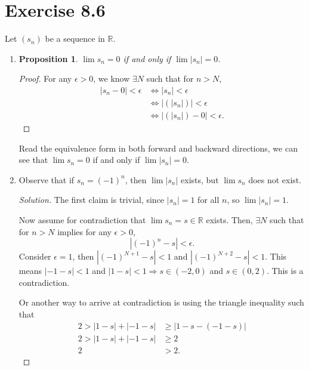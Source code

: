 \documentclass{article}
\newtheorem{proposition}[thm]{Proposition}
\begin{document}
\section*{Exercise 8.6}
Let $(s_n)$ be a sequence in $\mathbb{R}$.
\begin{enumerate}[label=(\alph*)]
    \item 
    \begin{proposition}
        $\lim s_n=0$ if and only if $\lim |s_n|=0$.
    \end{proposition}
    \begin{proof}
        For any $\epsilon>0$, we know $\exists N$ such that for $n>N$, 
        \begin{align*}
            |s_n-0| <\epsilon &\Leftrightarrow |s_n| < \epsilon \\
            &\Leftrightarrow |(|s_n|)| < \epsilon \\
            & \Leftrightarrow |(|s_n|)-0| < \epsilon.
        \end{align*}
    \end{proof}

    Read the equivalence form in both forward and backward directions, we can see that 
    $\lim s_n = 0$ if and only if $\lim |s_n| = 0$.

    \item
    Observe that if $s_n = (-1)^n$, then $\lim|s_n|$ exists, but $\lim s_n$ does not exist.
    \begin{proof}[Solution]
        The first claim is trivial, since $|s_n| = 1$ for all $n$, so $\lim|s_n| = 1$.

        Now assume for contradiction that $\lim s_n = s\in\mathbb{R}$ exists. Then, $\exists N$
        such that for $n>N$ implies for any $\epsilon>0$, $$|(-1)^n-s|<\epsilon.$$
        Consider $\epsilon = 1$, then $|(-1)^{N+1}-s|<1$ and $|(-1)^{N+2}-s|<1$. This means 
        $|-1-s|<1$ and $|1-s|<1\Rightarrow s\in (-2,0)$ and $s\in (0,2)$. This is a contradiction.

        Or another way to arrive at contradiction is using the triangle inequality such that 
        \begin{align*}
            2 > |1-s| + |-1-s| & \ge |1-s-(-1-s)| \\
            2 > |1-s| + |-1-s| & \ge 2 \\
            2 & > 2.
        \end{align*}
    \end{proof}
\end{enumerate}
\end{document}
